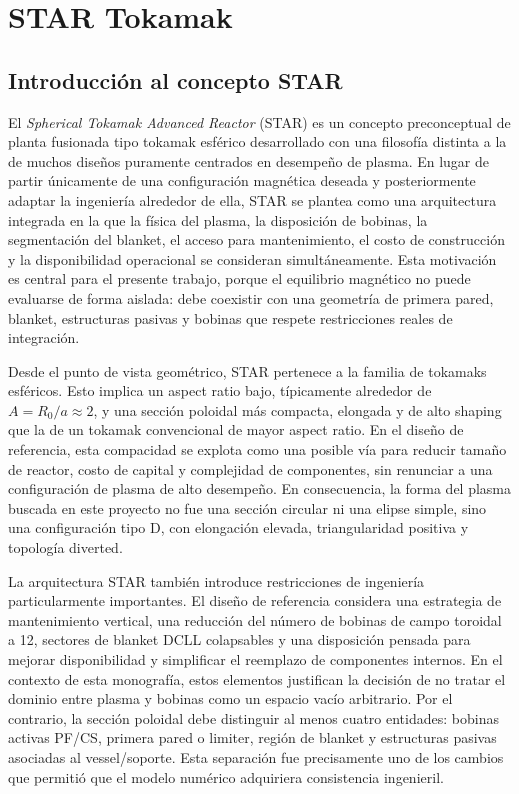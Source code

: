 \documentclass[11pt,a4paper]{article}
\begin{document}

\section{STAR Tokamak}
\label{sec:star_tokamak}


\subsection{Introducción al concepto STAR}
El \emph{Spherical Tokamak Advanced Reactor} (STAR) es un concepto preconceptual de planta
fusionada tipo tokamak esférico desarrollado con una filosofía distinta a la de muchos diseños
puramente centrados en desempeño de plasma. En lugar de partir únicamente de una configuración
magnética deseada y posteriormente adaptar la ingeniería alrededor de ella, STAR se plantea como
una arquitectura integrada en la que la física del plasma, la disposición de bobinas, la segmentación
del blanket, el acceso para mantenimiento, el costo de construcción y la disponibilidad operacional
se consideran simultáneamente. Esta motivación es central para el presente trabajo, porque el
equilibrio magnético no puede evaluarse de forma aislada: debe coexistir con una geometría de
primera pared, blanket, estructuras pasivas y bobinas que respete restricciones reales de integración.

Desde el punto de vista geométrico, STAR pertenece a la familia de tokamaks esféricos. Esto implica
un aspect ratio bajo, típicamente alrededor de $A=R_0/a\approx 2$, y una sección poloidal más
compacta, elongada y de alto shaping que la de un tokamak convencional de mayor aspect ratio. En
el diseño de referencia, esta compacidad se explota como una posible vía para reducir tamaño de
reactor, costo de capital y complejidad de componentes, sin renunciar a una configuración de plasma
de alto desempeño. En consecuencia, la forma del plasma buscada en este proyecto no fue una
sección circular ni una elipse simple, sino una configuración tipo D, con elongación elevada,
triangularidad positiva y topología diverted.

La arquitectura STAR también introduce restricciones de ingeniería particularmente importantes.
El diseño de referencia considera una estrategia de mantenimiento vertical, una reducción del número
de bobinas de campo toroidal a 12, sectores de blanket DCLL colapsables y una disposición pensada
para mejorar disponibilidad y simplificar el reemplazo de componentes internos. En el contexto de
esta monografía, estos elementos justifican la decisión de no tratar el dominio entre plasma y bobinas
como un espacio vacío arbitrario. Por el contrario, la sección poloidal debe distinguir al menos cuatro
entidades: bobinas activas PF/CS, primera pared o limiter, región de blanket y estructuras pasivas
asociadas al vessel/soporte. Esta separación fue precisamente uno de los cambios que permitió que el
modelo numérico adquiriera consistencia ingenieril.
\end{document}
